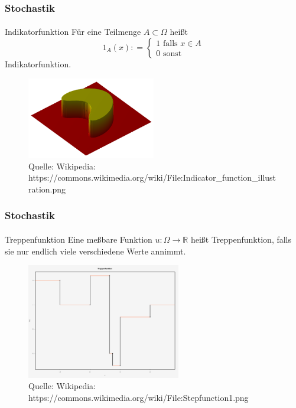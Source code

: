 \documentclass{beamer}
\begin{document}
\begin{frame}
    \frametitle{Stochastik}
\framesubtitle{}
\begin{block}{Indikatorfunktion}
    Für eine Teilmenge $A \subset \Omega$ heißt
    $$ 1_A (x): = \begin{cases} 1 \text{  falls }   x \in A  \\  0  \text{  sonst}  \end{cases}$$
    Indikatorfunktion.
    \end{block}
    
    \begin{figure}[H]
          \centering
        \includegraphics[width=0.5\textwidth]{img/640px-Indicator_function_illustration}
          \caption{Quelle: Wikipedia: https://commons.wikimedia.org/wiki/File:Indicator\_function\_illustration.png}
    
    \end{figure}
\end{frame}



\begin{frame}
    \frametitle{Stochastik}
\framesubtitle{}
    \begin{block}{Treppenfunktion}
        Eine meßbare Funktion $u: \Omega \to \mathbb{R}$ 
        heißt Treppenfunktion, 
        falls sie nur endlich viele verschiedene Werte annimmt.
    \end{block}


\begin{figure}[H]
    \centering
  \includegraphics[width=0.6\textwidth]{img/640px-Stepfunction1}
    \caption{Quelle: Wikipedia: https://commons.wikimedia.org/wiki/File:Stepfunction1.png}

\end{figure}
\end{frame}
\end{document}
